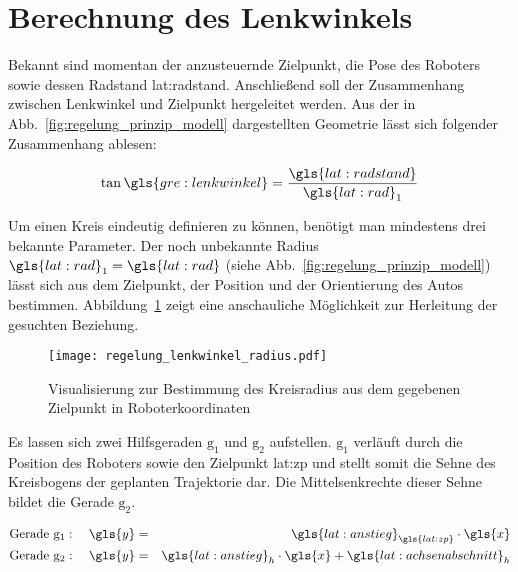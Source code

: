 \section{Berechnung des Lenkwinkels \dcfirstauthorshort}
\label{sec:regelung:lenkwinkel}

Bekannt sind momentan der anzusteuernde Zielpunkt, die Pose des Roboters sowie dessen Radstand \gls{lat:radstand}. Anschließend soll der Zusammenhang zwischen Lenkwinkel und Zielpunkt hergeleitet werden. 
Aus der in Abb.~\ref{fig:regelung_prinzip_modell} dargestellten Geometrie lässt sich folgender Zusammenhang ablesen:

\begin{equation}
\tan \gls{gre:lenkwinkel} = \frac{\gls{lat:radstand}}{{\gls{lat:rad}}_1}
\label{eq:regelung_lenkwinkel_lenkwinkeltan}
\end{equation}

Um einen Kreis eindeutig definieren zu können, benötigt man mindestens drei bekannte Parameter. Der noch unbekannte Radius \({\gls{lat:rad}}_1 = \gls{lat:rad}\) (siehe Abb.~\ref{fig:regelung_prinzip_modell}) lässt sich aus dem Zielpunkt, der Position und der Orientierung des Autos bestimmen. Abbildung~\ref{fig:regelung_lenkwinkel_radius} zeigt eine anschauliche Möglichkeit zur Herleitung der gesuchten Beziehung. 

\begin{figure}[htbp] %
  \centering
  \texttt{[image: regelung\_lenkwinkel\_radius.pdf]}
  \caption{Visualisierung zur Bestimmung des Kreisradius aus dem gegebenen Zielpunkt in Roboterkoordinaten}
  \label{fig:regelung_lenkwinkel_radius}
\end{figure}

Es lassen sich zwei Hilfsgeraden \( \mathrm{g_1} \) und \( \mathrm{g_2} \) aufstellen. \( \mathrm{g_1}\) verläuft durch die Position des Roboters  sowie den Zielpunkt \gls{lat:zp} und stellt somit die Sehne des Kreisbogens der geplanten Trajektorie dar. Die Mittelsenkrechte dieser Sehne bildet die Gerade \( \mathrm{g_2} \).

\begin{eqnarray}
\text{Gerade } \mathrm{g_1}: \quad \gls{y} & = & {\gls{lat:anstieg}}_{\gls{lat:zp}} \cdot \gls{x} 	\\
\text{Gerade } \mathrm{g_2}: \quad \gls{y} & = & {\gls{lat:anstieg}}_h \cdot \gls{x} + {\gls{lat:achsenabschnitt}}_h  \label{eq:regelung_lenkwinkel_geradengleichung2}
\end{eqnarray}

